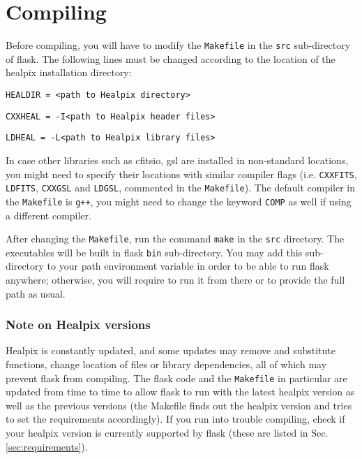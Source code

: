 \documentclass[12pt]{book} %
\begin{document}
\section{Compiling}
\label{sec:compiling}

Before compiling, you will have to modify the {\tt Makefile} in the {\tt src} sub-directory of {\sc flask}. 
The following lines must be changed according to the location of the {\sc healpix} installation directory:

\vspace{0.5cm}

\noindent
{\tt HEALDIR = <path to Healpix directory>}

\noindent
{\tt CXXHEAL = -I<path to Healpix header files>}

\noindent
{\tt LDHEAL  = -L<path to Healpix library files>} 
\vspace{0.5cm}

\noindent
In case other libraries such as {\sc cfitsio}, {\sc gsl} are installed in non-standard locations, 
you might need to specify their locations with similar compiler flags (i.e. {\tt CXXFITS}, {\tt LDFITS}, 
{\tt CXXGSL} and {\tt LDGSL}, commented in the {\tt Makefile}). The default compiler in the 
{\tt Makefile} is {\tt g++}, you might need to change the keyword {\tt COMP} as well if using a 
different compiler.

After changing the {\tt Makefile}, run the command {\tt make} in the {\tt src} directory. The 
executables will be built in {\sc flask} {\tt bin} sub-directory. You may add this sub-directory to 
your {\sc path} environment variable in order to be able to run {\sc flask} anywhere; otherwise, 
you will require to run it from there or to provide the full path as usual. 

\subsubsection{Note on Healpix versions}

{\sc Healpix} is constantly updated, and some updates may remove and substitute functions,
change location of files or library dependencies, all of which may prevent {\sc flask} from
compiling. The {\sc flask} code and the {\tt Makefile} in particular are updated from time to time
to allow {\sc flask} to run with the latest {\sc healpix} version as well as the previous versions
(the {\sc Makefile} finds out the {\sc healpix} version and tries to set the requirements accordingly).
If you run into trouble compiling, check if your {\sc healpix} version is currently supported by
{\sc flask} (these are listed in Sec. \ref{sec:requirements}).
\end{document}
